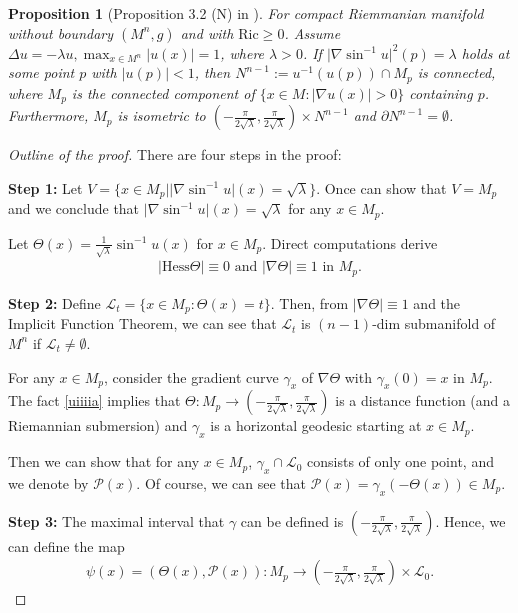 \documentclass[11pt]{amsart}
\newtheorem{proposition}[theorem]{Proposition}
\def\ric{\mathrm{Ric}}
\def\He{{\mathrm{Hess}}}
\begin{document}
\begin{proposition}[Proposition 3.2 (N) in \cite{xuxue}]\label{uiiiiia}
    For compact Riemmanian manifold without boundary $(M^n,g)$ and with $\ric\geq 0$. Assume $\Delta u=-\lambda u,\max _{x\in M^n}\vert u(x)\vert=1$, where $\lambda>0$. If $\vert \nabla\sin^{-1}u\vert^2(p)=\lambda$ holds at some point $p$ with $\vert u(p)\vert<1$, then $N^{n-1}:=u^{-1}(u(p))\cap M_p$ is connected, where $M_p$ is the connected component of $\{x\in M:\vert\nabla u(x)\vert>0\}$ containing $p$. Furthermore, $M_p$ is isometric to $\left(-\frac{\pi}{2\sqrt{\lambda}},\frac{\pi}{2\sqrt{\lambda}}\right)\times N^{n-1}$ and $\partial N^{n-1}=\emptyset$.
\end{proposition}

\begin{proof}[Outline of the proof]
    There are four steps in the proof:

    \textbf{Step 1:} Let $V=\{x\in M_p\vert\vert\nabla\sin^{-1} u\vert(x)=\sqrt{\lambda}\}$. Once can show that $V=M_p$ and we conclude that $\vert\nabla\sin^{-1} u\vert(x)=\sqrt{\lambda}$ for any $x\in M_p$.

    Let $\Theta(x)=\frac{1}{\sqrt{\lambda}}\sin^{-1} u(x)$ for $x\in M_p$. Direct computations derive
    \begin{align}\label{uiiiia}
        \vert \He\Theta\vert\equiv0\text{ and }\vert\nabla\Theta\vert\equiv 1\text{ in }M_p.
    \end{align}

    \textbf{Step 2:} Define $\mathcal{L}_t=\{x\in M_p:\Theta(x)=t\}$. Then, from $\vert\nabla\Theta\vert\equiv 1$ and the Implicit Function Theorem, we can see that $\mathcal{L}_t$ is $(n-1)$-dim submanifold of $M^n$ if $\mathcal{L}_t\neq \emptyset$.

    For any $x\in M_p$, consider the gradient curve $\gamma_x$ of $\nabla\Theta$ with $\gamma_x(0)=x$ in $M_p$. The fact \ref{uiiiia} implies that $\Theta:M_p\to\left(-\frac{\pi}{2\sqrt{\lambda}},\frac{\pi}{2\sqrt{\lambda}}\right)$ is a distance function (and a Riemannian submersion) and $\gamma_x$ is a horizontal geodesic starting at $x\in M_p$.

    Then we can show that for any $x\in M_p$, $\gamma_x\cap\mathcal{L}_0$ consists of only one point, and we denote by $\mathcal{P}(x)$. Of course, we can see that $\mathcal{P}(x)=\gamma_x(-\Theta(x))\in M_p$.

    \textbf{Step 3:} The maximal interval that  $\gamma$ can be defined is $\left(-\frac{\pi}{2\sqrt{\lambda}},\frac{\pi}{2\sqrt{\lambda}}\right)$. Hence, we can define the map
    \begin{align}
        \psi(x)=(\Theta(x),\mathcal{P}(x)):M_p\to\left(-\frac{\pi}{2\sqrt{\lambda}},\frac{\pi}{2\sqrt{\lambda}}\right)\times\mathcal{L}_0.
    \end{align}


\end{proof}
\end{document}
